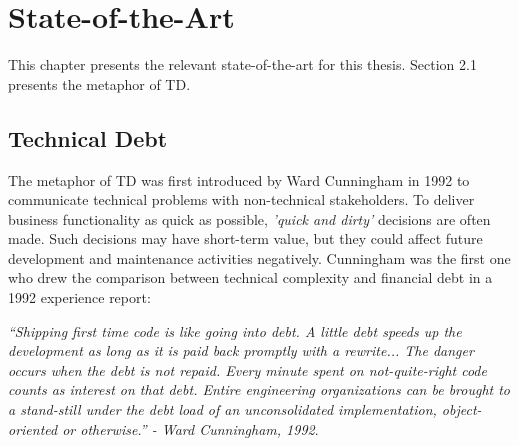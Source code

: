






\chapter{State-of-the-Art}
\label{chap:sota}


This chapter presents the relevant state-of-the-art for this thesis. Section 2.1 presents the metaphor of TD. 







\section{Technical Debt}
\label{sec:techdebt}
The metaphor of TD was first introduced by Ward Cunningham in 1992 to communicate technical problems with non-technical stakeholders\cite{p29-cunningham}. To deliver business functionality as quick as possible, \textit{'quick and dirty'} decisions are often made. Such decisions may have short-term value, but they could affect future development and maintenance activities negatively. Cunningham was the first one who drew the comparison between technical complexity and financial debt in a 1992 experience report\cite{p29-cunningham}: 

\begin{displayquote}
	\textit{“Shipping first time code is like going into debt. A little debt speeds up the development as long as it is paid back promptly with a rewrite... The danger occurs when the debt is not repaid. Every minute spent on not-quite-right code counts as interest on that debt. Entire engineering organizations can be brought to a stand-still under the debt load of an unconsolidated implementation, object-oriented or otherwise.” - Ward Cunningham, 1992}.
\end{displayquote}

